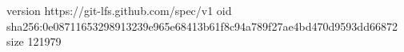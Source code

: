 version https://git-lfs.github.com/spec/v1
oid sha256:0e08711653298913239e965e68413b61f8c94a789f27ae4bd470d9593dd66872
size 121979
